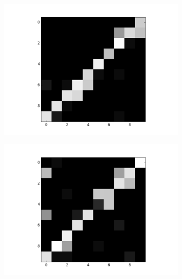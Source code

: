 \begin{figure}[h!]
\begin{subfigure}{.25\textwidth}
  		\label{fig:sub1}
	\end{subfigure}%
	\begin{subfigure}{.25\textwidth}
  		\centering
  		\includegraphics[width=\linewidth]{imgs/reconst/00005.png}
  		\label{fig:sub1}
	\end{subfigure}%
	\begin{subfigure}{.25\textwidth}
  		\centering
  		\includegraphics[width=\linewidth]{imgs/reconst/00007.png}
  		\label{fig:sub1}
	\end{subfigure}%
	

\end{figure}
